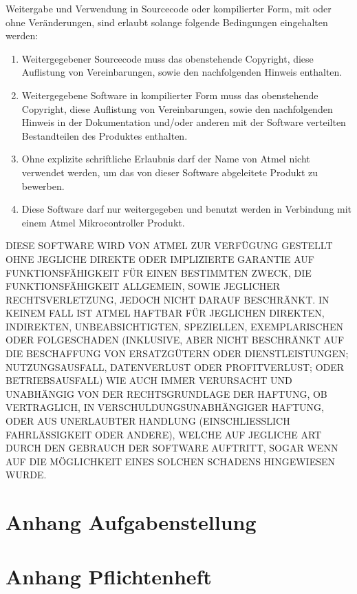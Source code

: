 Weitergabe und Verwendung in Sourcecode oder kompilierter Form, mit oder ohne Veränderungen, sind erlaubt solange folgende Bedingungen eingehalten werden:
\begin{enumerate}
	\item Weitergegebener Sourcecode muss das obenstehende Copyright, diese Auflistung von Vereinbarungen, sowie den nachfolgenden Hinweis enthalten.
	\item Weitergegebene Software in kompilierter Form muss das obenstehende Copyright, diese Auflistung von Vereinbarungen, sowie den nachfolgenden Hinweis in der Dokumentation und/oder anderen mit der Software verteilten Bestandteilen des Produktes enthalten.
	\item Ohne explizite schriftliche Erlaubnis darf der Name von Atmel nicht verwendet werden, um das von dieser Software abgeleitete Produkt zu bewerben.
	\item Diese Software darf nur weitergegeben und benutzt werden in Verbindung mit einem Atmel Mikrocontroller Produkt.
\end{enumerate}

DIESE SOFTWARE WIRD VON ATMEL ZUR VERFÜGUNG GESTELLT OHNE JEGLICHE DIREKTE ODER IMPLIZIERTE GARANTIE AUF FUNKTIONSFÄHIGKEIT FÜR EINEN BESTIMMTEN ZWECK, DIE FUNKTIONSFÄHIGKEIT ALLGEMEIN, SOWIE JEGLICHER RECHTSVERLETZUNG, JEDOCH NICHT DARAUF BESCHRÄNKT. IN KEINEM FALL IST ATMEL HAFTBAR FÜR JEGLICHEN DIREKTEN, INDIREKTEN, UNBEABSICHTIGTEN, SPEZIELLEN, EXEMPLARISCHEN ODER FOLGESCHADEN (INKLUSIVE, ABER NICHT BESCHRÄNKT AUF DIE BESCHAFFUNG VON ERSATZGÜTERN ODER DIENSTLEISTUNGEN; NUTZUNGSAUSFALL, DATENVERLUST ODER PROFITVERLUST; ODER BETRIEBSAUSFALL) WIE AUCH IMMER VERURSACHT UND UNABHÄNGIG VON DER RECHTSGRUNDLAGE DER HAFTUNG, OB VERTRAGLICH, IN VERSCHULDUNGSUNABHÄNGIGER HAFTUNG, ODER AUS UNERLAUBTER HANDLUNG (EINSCHLIESSLICH FAHRLÄSSIGKEIT ODER ANDERE), WELCHE AUF JEGLICHE ART DURCH DEN GEBRAUCH DER SOFTWARE AUFTRITT, SOGAR WENN AUF DIE MÖGLICHKEIT EINES SOLCHEN SCHADENS HINGEWIESEN WURDE.



\clearpage
\section{Anhang Aufgabenstellung}\label{sec:appendix_aufgabenstellung}




\clearpage
\section{Anhang Pflichtenheft}\label{sec:appendix_pflichtenheft}

